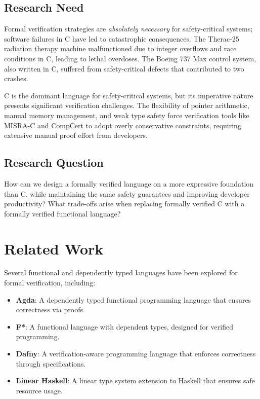 \documentclass[conference]{IEEEtran}
\begin{document}
\subsection{Research Need}

Formal verification strategies are \emph{absolutely necessary} for safety-critical systems; software failures in C have led to catastrophic consequences. The Therac-25 radiation therapy machine malfunctioned due to integer overflows and race conditions in C, leading to lethal overdoses. The Boeing 737 Max control system, also written in C, suffered from safety-critical defects that contributed to two crashes.

C is the dominant language for safety-critical systems, but its imperative nature presents significant verification challenges. The flexibility of pointer arithmetic, manual memory management, and weak type safety force verification tools like MISRA-C and CompCert to adopt overly conservative constraints, requiring extensive manual proof effort from developers.

\subsection{Research Question}

How can we design a formally verified language on a more expressive foundation than C, while maintaining the same safety guarantees and improving developer productivity? What trade-offs arise when replacing formally verified C with a formally verified functional language?

\section{Related Work}
Several functional and dependently typed languages have been explored for formal verification, including:

\begin{itemize}
    \item \textbf{Agda}: A dependently typed functional programming language that ensures correctness via proofs.
    \item \textbf{F*}: A functional language with dependent types, designed for verified programming.
    \item \textbf{Dafny}: A verification-aware programming language that enforces correctness through specifications.
    \item \textbf{Linear Haskell}: A linear type system extension to Haskell that ensures safe resource usage.
\end{itemize}
\end{document}
